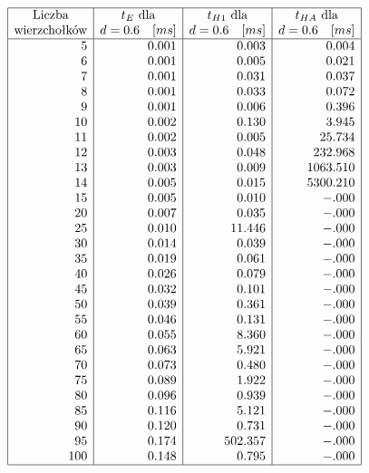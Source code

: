\documentclass[polish,polish,a4paper]{article}
\begin{document}
\begin{spacing}{1.25}
\begin{spacing}{1.3}
	\begin{equation*}
	\begin{array}{|r|r|r|r|}
	\hline
	\multicolumn{1}{|c|}{$Liczba$}&
	\multicolumn{1}{c|}{t_{E}$ dla$ }&
	\multicolumn{1}{c|}{t_{H1} $ dla$}&
	\multicolumn{1}{c|}{t_{HA}$ dla$}\\
	\multicolumn{1}{|c|}{$wierzchołków$}&
	\multicolumn{1}{c|}{d = 0.6 \quad [ms]}&
	\multicolumn{1}{c|}{d = 0.6 \quad [ms]}&
	\multicolumn{1}{c|}{d = 0.6 \quad [ms]}\\
	\hline
5&0.001&0.003&0.004\\
6&0.001&0.005&0.021\\
7&0.001&0.031&0.037\\
8&0.001&0.033&0.072\\
9&0.001&0.006&0.396\\
10&0.002&0.130&3.945\\
11&0.002&0.005&25.734\\
12&0.003&0.048&232.968\\
13&0.003&0.009&1063.510\\
14&0.005&0.015&5300.210\\
15&0.005&0.010&-.000\\
20&0.007&0.035&-.000\\
25&0.010&11.446&-.000\\
30&0.014&0.039&-.000\\
35&0.019&0.061&-.000\\
40&0.026&0.079&-.000\\
45&0.032&0.101&-.000\\
50&0.039&0.361&-.000\\
55&0.046&0.131&-.000\\
60&0.055&8.360&-.000\\
65&0.063&5.921&-.000\\
70&0.073&0.480&-.000\\
75&0.089&1.922&-.000\\
80&0.096&0.939&-.000\\
85&0.116&5.121&-.000\\
90&0.120&0.731&-.000\\
95&0.174&502.357&-.000\\
100&0.148&0.795&-.000\\
\hline
	\end{array}
	\end{equation*}
\end{spacing}


	\begin{figure}[H]
		\centering

\end{figure}
\end{spacing}
\end{document}
